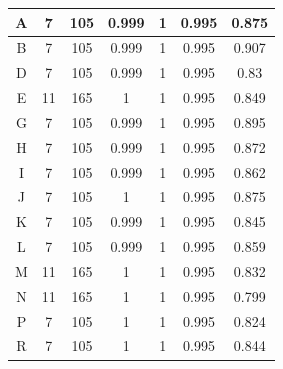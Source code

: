 \begin{center}
\begin{longtable}[c]{|c|c|c|c|c|c|c|}
    A              & 7                          & 105                   & 0.999      & 1          & 0.995            & 0.875                 \\ \hline
    B              & 7                          & 105                   & 0.999      & 1          & 0.995            & 0.907                 \\ \hline
    D              & 7                          & 105                   & 0.999      & 1          & 0.995            & 0.83                  \\ \hline
    E              & 11                         & 165                   & 1          & 1          & 0.995            & 0.849                 \\ \hline
    G              & 7                          & 105                   & 0.999      & 1          & 0.995            & 0.895                 \\ \hline
    H              & 7                          & 105                   & 0.999      & 1          & 0.995            & 0.872                 \\ \hline
    I              & 7                          & 105                   & 0.999      & 1          & 0.995            & 0.862                 \\ \hline
    J              & 7                          & 105                   & 1          & 1          & 0.995            & 0.875                 \\ \hline
    K              & 7                          & 105                   & 0.999      & 1          & 0.995            & 0.845                 \\ \hline
    L              & 7                          & 105                   & 0.999      & 1          & 0.995            & 0.859                 \\ \hline
    M              & 11                         & 165                   & 1          & 1          & 0.995            & 0.832                 \\ \hline
    N              & 11                         & 165                   & 1          & 1          & 0.995            & 0.799                 \\ \hline
    P              & 7                          & 105                   & 1          & 1          & 0.995            & 0.824                 \\ \hline
    R              & 7                          & 105                   & 1          & 1          & 0.995            & 0.844                 \\ \hline

\end{longtable}
\end{center}
